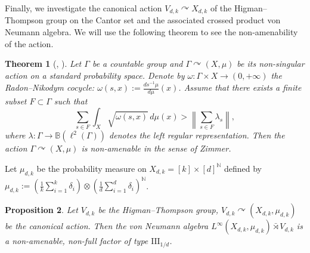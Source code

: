 \documentclass{amsart}
\newtheorem{theorem}{Theorem}[section]
\newtheorem{proposition}[theorem]{Proposition}
\theoremstyle{remark}
\theoremstyle{definition}
\begin{document}
Finally, we investigate the canonical action $V_{d, k} \curvearrowright X_{d, k}$ of the Higman--Thompson group on the Cantor set and the associated crossed product von Neumann algebra.
We will use the following theorem to see the non-amenability of the action.

\begin{theorem}[{\cite[Theorem 7]{DouglasNowak}, \cite[Proposition 5.3]{VaesWahl}}] \label{non-amenable}
Let $\Gamma$ be a countable group and $\Gamma \curvearrowright (X, \mu)$ be its non-singular action on a standard probability space.
Denote by $\omega \colon \Gamma \times X \to (0, + \infty)$ the Radon--Nikodym cocycle: $\displaystyle \omega (s, x) := \frac{ds^{-1}\mu}{d\mu}(x)$.
Assume that there exists a finite subset $F \subset \Gamma$ such that 
\[
\sum _{s \in F} \int _X \sqrt{\omega(s, x)} \, d\mu(x) > \left\| \sum _{s \in F} \lambda _s \right\|,
\]
where $\lambda \colon \Gamma \to \mathbb{B}(\ell ^2 (\Gamma))$ denotes the left regular representation.
Then the action $\Gamma \curvearrowright (X, \mu)$ is non-amenable in the sense of Zimmer.
\end{theorem}

Let $\mu_{d, k}$ be the probability measure on $X_{d, k} = [k] \times [d]^{\mathbb{N}}$ defined by $\mu_{d, k} := \left( \frac{1}{k} \sum_{i=1}^k \delta _i \right) \otimes \left( \frac{1}{d} \sum_{i=1}^d \delta _i \right)^{\mathbb{N}}$.

\begin{proposition}\label{HigmanThompsonalgebra}
Let $V_{d, k}$ be the Higman--Thompson group, $V_{d, k} \curvearrowright (X_{d, k}, \mu_{d, k})$ be the canonical action. 
Then the von Neumann algebra $L^{\infty}(X_{d, k}, \mu_{d, k}) \bar{\rtimes} V_{d, k}$ is a non-amenable, non-full factor of type $\mathrm{III}_{1/d}$.
\end{proposition}
\end{document}
